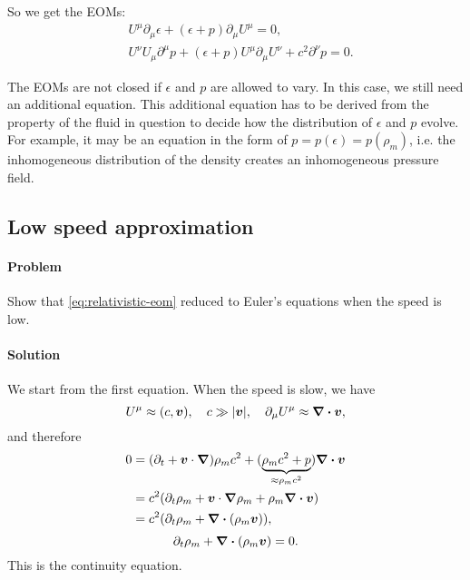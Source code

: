 \documentclass[hyperref, a4paper]{article}
\begin{document}
So we get the EOMs:
\begin{equation}
    \begin{aligned}
        &U^\mu \partial_\mu \epsilon + (\epsilon + p) \partial_\mu U^\mu = 0, \\
        &U^\nu U_\mu \partial^\mu p + (\epsilon + p) U^\mu \partial_\mu U^\nu + c^2 \partial^\nu p = 0.
    \end{aligned}
    \label{eq:relativistic-eom}
\end{equation}

The EOMs are not closed if $\epsilon$ and $p$ are allowed to vary. In this case, we still need an additional
equation. This additional equation has to be derived from the property of the fluid in question to decide 
how the distribution of $\epsilon$ and $p$ evolve. For example, it may be an equation in the form of 
$p = p (\epsilon) = p(\rho_m)$, i.e. the inhomogeneous distribution of the density creates an inhomogeneous
pressure field.

\subsection{Low speed approximation}

\paragraph{Problem} Show that \eqref{eq:relativistic-eom} reduced to Euler's equations when the speed is low.

\paragraph{Solution} We start from the first equation. When the speed is slow, we have 
\begin{equation}
    U^\mu \approx (c, \vb*{v}), \quad c \gg \abs{\vb*{v}}, \quad \partial_\mu U^\mu \approx \div{\vb*{v}},
\end{equation}
and therefore 
\[
    \begin{aligned}
        0 &= (\partial_t + \vb*{v} \cdot \grad ) \rho_m c^2 + (\underbrace{\rho_m c^2 + p}_{\approx \rho_m c^2}) \div{\vb*{v}} \\
        &= c^2 (\partial_t \rho_m + \vb*{v} \cdot \grad \rho_m + \rho_m \div{\vb*{v}}) \\
        &= c^2 (\partial_t \rho_m + \div{(\rho_m \vb*{v})}), 
    \end{aligned}
\]
\begin{equation}
    \partial_t \rho_m + \div{(\rho_m \vb*{v})} = 0.
\end{equation}
This is the continuity equation. 
\end{document}

